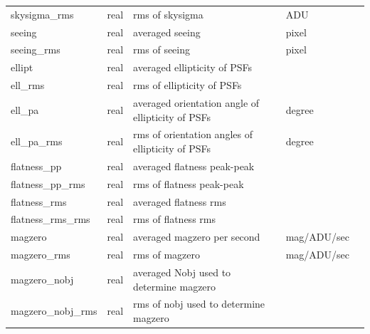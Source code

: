 \documentclass[12pt]{article}
\begin{document}
\begin{table}[thbp]
\begin{center}
{\begin{tabular}{llllll}
skysigma\_rms & real & rms of skysigma                                          &                           & ADU              &             \\
seeing & real & averaged seeing                                          &                           & pixel            &             \\
seeing\_rms & real & rms of seeing                                            &                           & pixel            &             \\
ellipt & real & averaged ellipticity of PSFs                             &                           &                  &             \\
ell\_rms & real & rms of ellipticity of PSFs                               &                           &                  &             \\
ell\_pa & real & averaged orientation angle of ellipticity of PSFs        &                           & degree           &             \\
ell\_pa\_rms & real & rms of orientation angles of ellipticity of PSFs         &                           & degree           &             \\
flatness\_pp & real & averaged flatness peak-peak                              &                           &                  &             \\
flatness\_pp\_rms & real & rms of flatness peak-peak                                &                           &                  &             \\
flatness\_rms & real & averaged flatness rms                                    &                           &                  &             \\
flatness\_rms\_rms & real & rms of flatness rms                                      &                           &                  &             \\
magzero & real & averaged magzero per second                              &                           & mag/ADU/sec      &             \\
magzero\_rms & real & rms of magzero                                           &                           & mag/ADU/sec      &             \\
magzero\_nobj & real & averaged Nobj used to determine magzero                  &                           &                  &             \\
magzero\_nobj\_rms & real & rms of nobj used to determine magzero                    &                           &                  &             \\

\end{tabular}}
\end{center}
\end{table}
\end{document}
